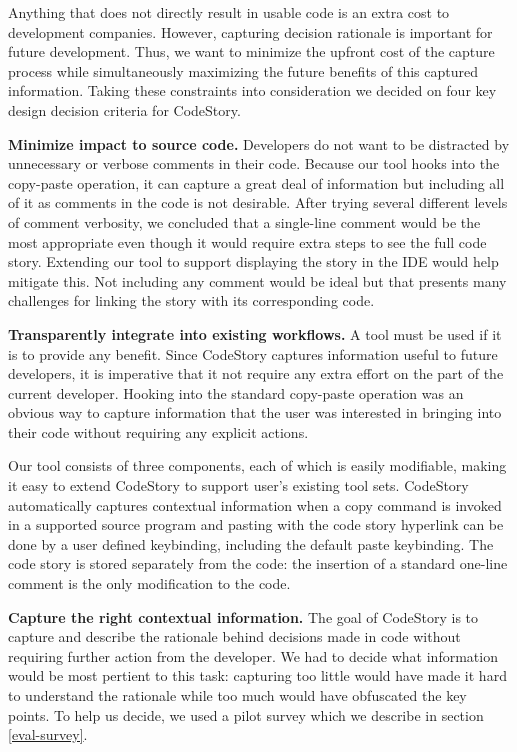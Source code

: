 \documentclass[../manifest.tex]{subfiles}
\begin{document}
Anything that does not directly result in usable code is an extra cost to development companies. However, capturing decision rationale is important for future development. Thus, we want to minimize the upfront cost of the capture process while simultaneously maximizing the future benefits of this captured information. Taking these constraints into consideration we decided on four key design decision criteria for CodeStory.

\textbf{Minimize impact to source code.} Developers do not want to be distracted by unnecessary or verbose comments in their code. Because our tool hooks into the copy-paste operation, it can capture a great deal of information but including all of it as comments in the code is not desirable. After trying several different levels of comment verbosity, we concluded that a single-line comment would be the most appropriate even though it would require extra steps to see the full code story. Extending our tool to support displaying the story in the IDE would help mitigate this. Not including any comment would be ideal but that presents many challenges for linking the story with its corresponding code.

\textbf{Transparently integrate into existing workflows.} A tool must be used if it is to provide any benefit. Since CodeStory captures information useful to future developers, it is imperative that it not require any extra effort on the part of the current developer. Hooking into the standard copy-paste operation was an obvious way to capture information that the user was interested in bringing into their code without requiring any explicit actions.

Our tool consists of three components, each of which is easily modifiable, making it easy to extend CodeStory to support user's existing tool sets. CodeStory automatically captures contextual information when a copy command is invoked in a supported source program and pasting with the code story hyperlink can be done by a user defined keybinding, including the default paste keybinding. The code story is stored separately from the code: the insertion of a standard one-line comment is the only modification to the code.

\textbf{Capture the right contextual information.} The goal of CodeStory is to capture and describe the rationale behind
decisions made in code without requiring further action from the developer. We had to decide what information would be most pertient to this task: capturing too little would have made it hard to understand the rationale while too much would have obfuscated the key points. To help us decide, we used a pilot survey which we describe in section \ref{eval-survey}.
\end{document}
